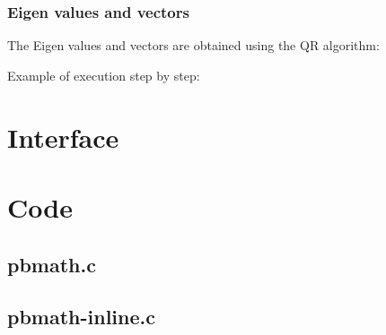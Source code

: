 \subsubsection{Eigen values and vectors}

The Eigen values and vectors are obtained using the QR algorithm:\\

\begin{scriptsize}
\begin{ttfamily}

\end{ttfamily}
\end{scriptsize}

Example of execution step by step:\\

\begin{scriptsize}
\begin{ttfamily}

\end{ttfamily}
\end{scriptsize}

\section{Interface}

\begin{scriptsize}
\begin{ttfamily}

\end{ttfamily}
\end{scriptsize}

\section{Code}

\subsection{pbmath.c}

\begin{scriptsize}
\begin{ttfamily}

\end{ttfamily}
\end{scriptsize}

\subsection{pbmath-inline.c}

